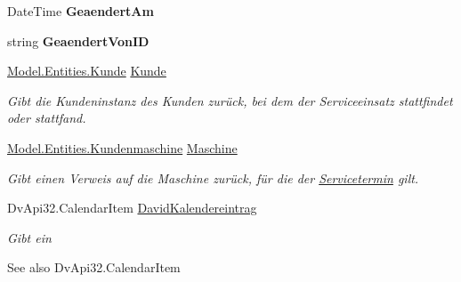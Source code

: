 \begin{DoxyCompactItemize}
\item 
Date\+Time {\bfseries Geaendert\+Am}\hypertarget{class_products_1_1_model_1_1_entities_1_1_servicetermin_a18d6bbd4b53533a95aa52ee7c747ac2c}{}\label{class_products_1_1_model_1_1_entities_1_1_servicetermin_a18d6bbd4b53533a95aa52ee7c747ac2c}

\item 
string {\bfseries Geaendert\+Von\+ID}\hypertarget{class_products_1_1_model_1_1_entities_1_1_servicetermin_afaeb384375bfd9f29fe72f22606b7716}{}\label{class_products_1_1_model_1_1_entities_1_1_servicetermin_afaeb384375bfd9f29fe72f22606b7716}

\item 
\hyperlink{class_products_1_1_model_1_1_entities_1_1_kunde}{Model.\+Entities.\+Kunde} \hyperlink{class_products_1_1_model_1_1_entities_1_1_servicetermin_ae762398a401a1a2a3428b270176c96dd}{Kunde}
\begin{DoxyCompactList}\small\item\em Gibt die Kundeninstanz des Kunden zurück, bei dem der Serviceeinsatz stattfindet oder stattfand. \end{DoxyCompactList}\item 
\hyperlink{class_products_1_1_model_1_1_entities_1_1_kundenmaschine}{Model.\+Entities.\+Kundenmaschine} \hyperlink{class_products_1_1_model_1_1_entities_1_1_servicetermin_a7354eef6703d90e47f67faf1456c0022}{Maschine}
\begin{DoxyCompactList}\small\item\em Gibt einen Verweis auf die Maschine zurück, für die der \hyperlink{class_products_1_1_model_1_1_entities_1_1_servicetermin}{Servicetermin} gilt. \end{DoxyCompactList}\item 
Dv\+Api32.\+Calendar\+Item \hyperlink{class_products_1_1_model_1_1_entities_1_1_servicetermin_afd11925fbf9a90a6d197638c2c7d4866}{David\+Kalendereintrag}
\begin{DoxyCompactList}\small\item\em Gibt ein \begin{DoxySeeAlso}{See also}
Dv\+Api32.\+Calendar\+Item



\end{DoxySeeAlso}
\end{DoxyCompactList}
\end{DoxyCompactItemize}
